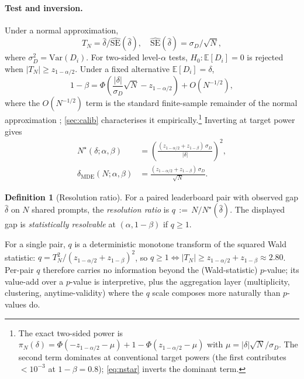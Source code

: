 \documentclass{article}
\theoremstyle{plain}
\theoremstyle{definition}
\newtheorem{definition}{Definition}
\begin{document}
\paragraph{Test and inversion.} Under a normal approximation,
\begin{equation}
\label{eq:wald}
T_N = \hat\delta/\widehat{\mathrm{SE}}(\hat\delta), \quad \widehat{\mathrm{SE}}(\hat\delta) = \sigma_D/\sqrt{N},
\end{equation}
where $\sigma_D^2 = \mathrm{Var}(D_i)$. For two-sided level-$\alpha$ tests, $H_0: \mathbb{E}[D_i] = 0$ is rejected when $|T_N| \geq z_{1-\alpha/2}$. Under a fixed alternative $\mathbb{E}[D_i] = \delta$,
\begin{equation}
\label{eq:power}
1-\beta = \Phi\!\left(\frac{|\delta|}{\sigma_D}\sqrt{N} - z_{1-\alpha/2}\right) + O(N^{-1/2}),
\end{equation}
where the $O(N^{-1/2})$ term is the standard finite-sample remainder of the normal approximation \citep{hall1992bootstrap}; \cref{sec:calib} characterises it empirically.\footnote{The exact two-sided power is $\pi_N(\delta) = \Phi(-z_{1-\alpha/2} - \mu) + 1 - \Phi(z_{1-\alpha/2} - \mu)$ with $\mu = |\delta|\sqrt{N}/\sigma_D$. The second term dominates at conventional target powers (the first contributes $<10^{-3}$ at $1{-}\beta = 0.8$); \cref{eq:nstar} inverts the dominant term.} Inverting at target power gives
\begin{align}
N^{\star}(\delta;\alpha,\beta) &= \!\left(\!\frac{(z_{1-\alpha/2}{+}z_{1-\beta})\,\sigma_D}{|\delta|}\!\right)^{\!2}\!, \label{eq:nstar}\\
\delta_{\mathrm{MDE}}(N;\alpha,\beta) &= \frac{(z_{1-\alpha/2}{+}z_{1-\beta})\,\sigma_D}{\sqrt{N}}. \label{eq:mde}
\end{align}
\begin{definition}[Resolution ratio]
\label{def:resratio}
For a paired leaderboard pair with observed gap $\hat\delta$ on $N$ shared prompts, the \emph{resolution ratio} is
$q \,:=\, N/N^{\star}(\hat\delta)$. The displayed gap is \emph{statistically resolvable} at $(\alpha,1{-}\beta)$ if $q \geq 1$.
\end{definition}
\noindent For a single pair, $q$ is a deterministic monotone transform of the squared Wald statistic: $q = T_N^2/(z_{1-\alpha/2}+z_{1-\beta})^2$, so $q\ge 1 \Leftrightarrow |T_N|\ge z_{1-\alpha/2}+z_{1-\beta} \approx 2.80$. Per-pair $q$ therefore carries no information beyond the (Wald-statistic) $p$-value; its value-add over a $p$-value is interpretive, plus the aggregation layer (multiplicity, clustering, anytime-validity) where the $q$ scale composes more naturally than $p$-values do.
\end{document}
